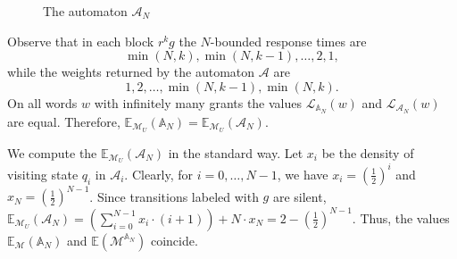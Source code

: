 \documentclass{lmcs}
\newcommand{\nestedA}{\mathbb{A}}
\newcommand{\lang}{\mathcal{L}}
\newcommand{\aut}{\mathcal{A}}
\newcommand{\expected}{\mathbb{E}}
\newcommand{\markov}{\mathcal{M}}
\begin{document}
\begin{exa}
\begin{figure}
\begin{center}
\end{center}
\caption{The automaton $\aut_N$}\label{fig:autN}
\end{figure}



Observe that in each block $r^k g$ the $N$-bounded response times are
\[
    \min(N,k), \min(N,k-1), \ldots, 2, 1,
\]
while the weights returned by the automaton $\aut$ are
\[
    1,2, \ldots, \min(N,k-1), \min(N,k).
\]
On all words $w$ with infinitely many grants  the values $\lang_{\nestedA_N}(w)$ and $\lang_{\aut_N}(w)$ are equal.
Therefore, $\expected_{\markov_U}(\nestedA_N) = \expected_{\markov_U}(\aut_N)$.

We compute the $\expected_{\markov_U}(\aut_N)$ in the standard way. Let $x_i$ be the density of visiting state $q_i$ in $\aut_i$.
Clearly, for $i=0, \ldots, N-1$, we have $x_i = {(\frac{1}{2})}^{i}$ and $x_N = {(\frac{1}{2})}^{N-1}$.
Since transitions labeled with $g$ are silent,
$\expected_{\markov_U}(\aut_N) = (\sum_{i=0}^{N-1} x_i \cdot (i+1)) + N \cdot x_N =  2 -  {(\frac{1}{2})}^{N-1}$.
Thus,
the values $\expected_{\markov}(\nestedA_N)$  and $\expected(\markov^{\nestedA_N})$ coincide.
\end{exa}
\end{document}
